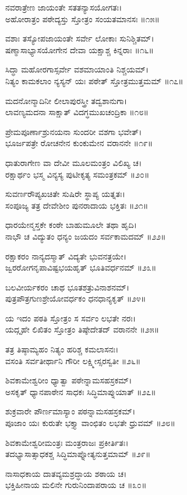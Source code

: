 ನವರಾತ್ರೇಣ ಜಾಯಂತೇ ಸತತನ್ಯಾಸಯೋಗತಃ।\\
ಅಹೋರಾತ್ರಂ ಪಠೇದ್ಯಸ್ತು ಸ್ತೋತ್ರಂ ಸಂಯತಮಾನಸಃ ॥೧೫॥

ವಶಾಃ ತಸ್ಯೋಪಜಾಯಂತೇ ಸರ್ವೇ ಲೋಕಾಃ ಸುನಿಶ್ಚಿತಮ್।\\
ಷಣ್ಮಾಸಾಭ್ಯಾಸಯೋಗೇನ ದೇವಾ ಯಕ್ಷಾಶ್ಚ ಕಿನ್ನರಾಃ ॥೧೬॥

ಸಿದ್ಧಾ ಮಹೋರಗಾಸ್ಸರ್ವೇ ವಶಮಾಯಾಂತಿ ನಿಶ್ಚಯಮ್।\\
ನಿತ್ಯಂ ಕಾಮಕಲಾಂ ನ್ಯಸ್ಯನ್ ಯಃ ಪಠೇತ್ ಸ್ತೋತ್ರಮುತ್ತಮಮ್ ॥೧೭॥

ಮದನೋನ್ಮಾದಿನೀ ಲೀಲಾಪುರಸ್ತ್ರೀ ತದ್ವಶಾನುಗಾ।\\
ಲಾವಣ್ಯಮದನಾ ಸಾಕ್ಷಾತ್ ವಿದಗ್ಧಮುಖಚಂದ್ರಿಕಾ ॥೧೮॥

ಪ್ರೇಮಪೂರ್ಣಾಶ್ರುನಯನಾ ಸುಂದರೀ ವಶಗಾ ಭವೇತ್।\\
ಭೂರ್ಜಪತ್ರೇ ರೋಚನೇನ ಕುಂಕುಮೇನ ವರಾನನೇ ॥೧೯॥

ಧಾತುರಾಗೇಣ ವಾ ದೇವೀ ಮೂಲಮಂತ್ರಂ ವಿಲಿಖ್ಯ ಚ।\\
ರಕ್ಷಾರ್ಥಂ ಭಸ್ಮ ವಿನ್ಯಸ್ಯ ಪುಟೀಕೃತ್ಯ ಸಮಂತ್ರಕಮ್ ॥೨೦॥

ಸುವರ್ಣರೌಪ್ಯಖಚಿತೇ ಸುಷಿರೇ ಸ್ಥಾಪ್ಯ ಯತ್ನತಃ।\\
ಸಂಪೂಜ್ಯ ತತ್ರ ದೇವೇಶೀಂ ಪುನರಾದಾಯ ಭಕ್ತಿತಃ ॥೨೧॥

ಧಾರಯೇನ್ಮಸ್ತಕೇ ಕಂಠೇ ಬಾಹುಮೂಲೇ ತಥಾ ಹೃದಿ।\\
ನಾಭೌ ಚ ವಿದ್ಯುತಂ ಧನ್ಯಂ ಜಯದಂ ಸರ್ವಕಾಮದಮ್ ॥೨೨॥

ರಕ್ಷಾಕರಂ ನಾನ್ಯದಸ್ಮಾತ್ ವಿದ್ಯತೇ ಭುವನತ್ರಯೇ।\\
ಜ್ವರರೋಗನೃಪಾವಿಷ್ಟಭಯಹೃತ್ ಭೂತಿವರ್ಧನಮ್ ॥೨೩॥

ಬಲವೀರ್ಯಕರಂ ಚಾಥ ಭೂತಶತ್ರುವಿನಾಶನಮ್।\\
ಪುತ್ರಪೌತ್ರಗುಣಶ್ರೇಯೋವರ್ಧಕಂ ಧನಧಾನ್ಯಕೃತ್ ॥೨೪॥

ಯ ಇದಂ ಪಠತಿ ಸ್ತೋತ್ರಂ ಸ ಸರ್ವಂ ಲಭತೇ ನರಃ।\\
ಯದ್ಗೃಹೇ ಲಿಖಿತಂ ಸ್ತೋತ್ರಂ ತಿಷ್ಠೇದೇತದ್ ವರಾನನೇ ॥೨೫॥

ತತ್ರ ತಿಷ್ಠಾಮ್ಯಹಂ ನಿತ್ಯಂ ಹರಿಶ್ಚ ಕಮಲಾಸನಃ।\\
ವಸಂತಿ ಸರ್ವತೀರ್ಥಾನಿ ಗೌರೀ ಲಕ್ಷ್ಮೀಸ್ಸರಸ್ವತೀ ॥೨೬॥

ಶಿವಕಾಮೇಶ್ವರೀಂ ಧ್ಯಾತ್ವಾ ಪಠೇನ್ನಾಮಸಹಸ್ರಕಮ್।\\
ಅಸಕೃತ್ ಧ್ಯಾನಪಾಠೇನ ಸಾಧಕಃ ಸಿದ್ಧಿಮಾಪ್ನುಯಾತ್ ॥೨೭॥

ಶುಕ್ರವಾರೇ ಪೌರ್ಣಮಾಸ್ಯಾಂ ಪಠನ್ನಾಮಸಹಸ್ರಕಮ್।\\
ಪೂಜಾಂ ಯಃ ಕುರುತೇ ಭಕ್ತ್ಯಾ ವಾಂಛಿತಂ ಲಭತೇ ಧ್ರುವಮ್ ॥೨೮॥

ಶಿವಕಾಮೇಶ್ವರೀಮಂತ್ರಃ ಮಂತ್ರರಾಜಃ ಪ್ರಕೀರ್ತಿತಃ।\\
ತದಭ್ಯಾಸಾತ್ಸಾಧಕಶ್ಚ ಸಿದ್ಧಿಮಾಪ್ನೋತ್ಯನುತ್ತಮಾಮ್ ॥೨೯॥

ನಾಸಾಧಕಾಯ ದಾತವ್ಯಮಶ್ರದ್ಧಾಯ ಶಠಾಯ ಚ।\\
ಭಕ್ತಿಹೀನಾಯ ಮಲಿನೇ ಗುರುನಿಂದಾಪರಾಯ ಚ ॥೩೦॥

